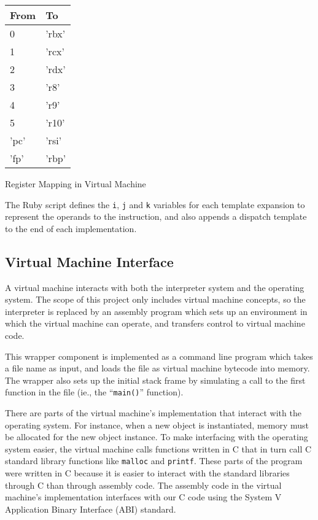 		\begin{myfigure}
			\begin{tabular}{|l|l|}
				\hline
				From & To \\
				\hline
				0 & 'rbx' \\
				\hline
				1 & 'rcx' \\
				\hline
				2 & 'rdx' \\
				\hline
				3 & 'r8' \\
				\hline
				4 & 'r9' \\
				\hline
				5 & 'r10' \\
				\hline
				'pc' & 'rsi' \\
				\hline
				'fp' & 'rbp' \\ 
				\hline
			\end{tabular}
			\caption{Register Mapping in Virtual Machine}
			\label{fig:regmap}
		\end{myfigure}
		
		The Ruby script defines the \texttt{i}, \texttt{j} and \texttt{k} variables for each template expansion to represent the operands to the instruction, and also appends a dispatch template to the end of each implementation.
		
		\subsection{Virtual Machine Interface}
		A virtual machine interacts with both the interpreter system and the operating system. The scope of this project only includes virtual machine concepts, so the interpreter is replaced by an assembly program which sets up an environment in which the virtual machine can operate, and transfers control to virtual machine code. 
		
		This wrapper component is implemented as a command line program which takes a file name as input, and loads the file as virtual machine bytecode into memory. The wrapper also sets up the initial stack frame by simulating a call to the first function in the file (ie., the ``\texttt{main()}'' function).
		
		There are parts of the virtual machine's implementation that interact with the operating system. For instance, when a new object is instantiated, memory must be allocated for the new object instance. To make interfacing with the operating system easier, the virtual machine calls functions written in C that in turn call C standard library functions like \texttt{malloc} and \texttt{printf}. These parts of the program were written in C because it is easier to interact with the standard libraries through C than through assembly code. The assembly code in the virtual machine's implementation interfaces with our C code using the System V Application Binary Interface (ABI) standard.
		
